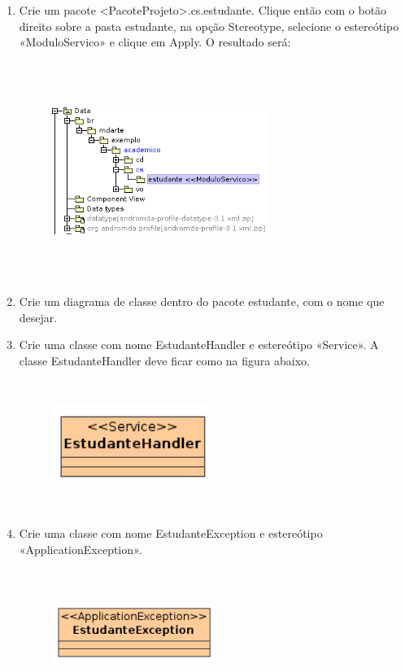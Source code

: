 \begin{enumerate}
\item Crie um pacote <PacoteProjeto>.cs.estudante. Clique então com o botão
direito sobre a pasta estudante, na opção Stereotype, selecione o estereótipo
 «ModuloServico» e clique em Apply. O resultado será:
 \begin{figure}[!htb]
	\centering
	\includegraphics[width=200pt,height=200pt]{imgs/tutorial-mdarte-0008.png}
\end{figure} 
	
\item Crie um diagrama de classe dentro do pacote estudante, com o nome que
desejar.
	
\item Crie uma classe com nome EstudanteHandler e estereótipo «Service». A
classe EstudanteHandler deve ficar como na figura abaixo.
\begin{figure}[!htb]
	\centering
	\includegraphics[width=150pt,height=120pt]{imgs/tutorial-mdarte-0009.png}
\end{figure} 
	
\item Crie uma classe com nome EstudanteException e estereótipo
«ApplicationException».
\begin{figure}[!htb]
	\centering
	\includegraphics[width=150pt,height=120pt]{imgs/tutorial-mdarte-0010.png}
\end{figure}
	

\end{enumerate}
